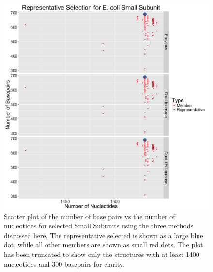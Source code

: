 \begin{figure}
  \includegraphics[width=\linewidth]{chapter-4/figs/ec-ssu-rep}
  \caption{Scatter plot of the number of base pairs vs the number of nucleotides
    for selected \EC{} Small Subunits using the three methods discussed here.
    The representative selected is shown as a large blue dot, while all other
    members are shown as small red dots. The plot has been truncated to show
    only the structures with at least 1400 nucleotides and 300 basepairs for
  clarity.}
  \label{fig:ec-ssu-rep}
\end{figure}

